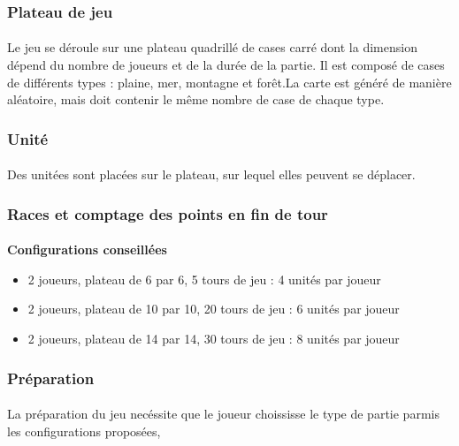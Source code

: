 \documentclass[a4paper]{article}
\begin{document}
\subsubsection{Plateau de jeu}
\paragraph{}
Le jeu se déroule sur une plateau quadrillé de cases carré dont la dimension dépend du nombre de joueurs et de la durée de la partie.\label{map_gen} Il est composé de cases de différents types : plaine, mer, montagne et forêt.La carte est généré de manière aléatoire, mais doit contenir le même nombre de case de chaque type.

\subsubsection{Unité}
\paragraph{}
Des unitées sont placées sur le plateau, sur lequel elles peuvent se déplacer.

\subsubsection{Races et comptage des points en fin de tour}

\paragraph{}
\textbf{Configurations conseillées}
\begin{itemize}
    \item 2 joueurs, plateau de 6 par 6, 5 tours de jeu : 4 unités par joueur
    \item 2 joueurs, plateau de 10 par 10, 20 tours de jeu : 6 unités par joueur
    \item 2 joueurs, plateau de 14 par 14, 30 tours de jeu : 8 unités par joueur
\end{itemize}

\subsubsection{Préparation}
\paragraph{}
La préparation du jeu necéssite que le joueur choississe le type de partie parmis les configurations proposées, 
\end{document}
